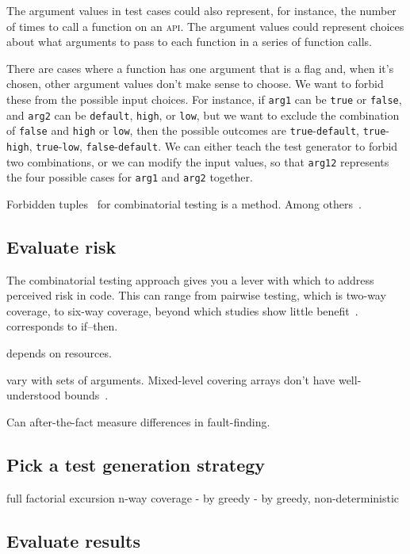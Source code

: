 \documentclass{juliacon}
\begin{document}
\vskip 6pt
The argument values in test cases could also represent, for instance, the number of times to call a function on an \textsc{api}. The argument values could represent choices about what arguments to pass to each function in a series of function calls.

\vskip 6pt
There are cases where a function has one argument that is a flag and, when it's chosen, other argument values don't make sense to choose. We want to forbid these from the possible input choices. For instance, if \verb|arg1| can be \verb|true| or \verb|false|, and \verb|arg2| can be \verb|default|, \verb|high|, or \verb|low|, but we want to exclude the combination of \verb|false| and \verb|high| or \verb|low|, then the possible outcomes are \verb|true|-\verb|default|, \verb|true|-\verb|high|, \verb|true|-\verb|low|, \verb|false|-\verb|default|. We can either teach the test generator to forbid two combinations, or we can modify the input values, so that \verb|arg12| represents the four possible cases for \verb|arg1| and \verb|arg2| together.

Forbidden tuples~\cite{Petke2015-ex} for combinatorial testing is a method. Among others~\cite{Grindal2006-vy}.


\subsection{Evaluate risk}

The combinatorial testing approach gives you a lever with which to address perceived risk in code. This can range from pairwise testing, which is two-way coverage, to six-way coverage, beyond which studies show little benefit~\cite{Petke2015-ex}. corresponds to if--then.

depends on resources.

vary with sets of arguments.
Mixed-level covering arrays don't have well-understood bounds~\cite{Cohen2003-pg}.

Can after-the-fact measure differences in fault-finding.


\subsection{Pick a test generation strategy}

full factorial
excursion
n-way coverage
 - by greedy
 - by greedy, non-deterministic


\subsection{Evaluate results}
\end{document}
